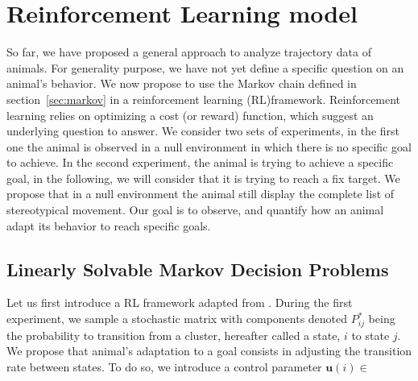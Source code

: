 \section{Reinforcement Learning model}
So far, we have proposed a general approach to analyze trajectory data of animals.
For generality purpose, we have not yet define a specific question on an animal's behavior.
We now propose to use the Markov chain defined in section~\ref{sec:markov} in a reinforcement learning (RL)framework.
Reinforcement learning relies on optimizing a cost (or reward) function, which suggest an underlying question to answer.
We consider two sets of experiments, in the first one the animal is observed in a null environment in which there is no specific goal to achieve.
In the second experiment, the animal is trying to achieve a specific goal, in the following, we will consider that it is trying to reach a fix target.
We propose that in a null environment the animal still display the complete list of stereotypical movement.
Our goal is to observe, and quantify how an animal adapt its behavior to reach specific goals.
\subsection{Linearly Solvable Markov Decision Problems}
Let us first introduce a RL framework adapted from \cite{todorovLinearlysolvableMarkovDecision2006}.
During the first experiment, we sample a stochastic matrix with components denoted $P^*_{ij}$ being the probability to transition from a cluster, hereafter called a state, $i$ to state $j$.
We propose that animal's adaptation to a goal consists in adjusting the transition rate between states.
To do so, we introduce a control parameter $\mathbf{u}(i) \in $ 




